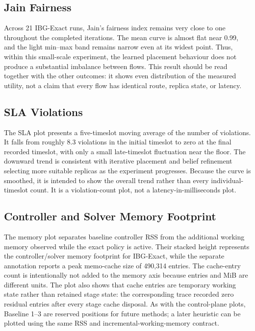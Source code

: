 \documentclass[12pt,a4paper]{article}
\begin{document}
\subsection{Jain Fairness}
Across 21 IBG-Exact runs, Jain's fairness index remains very close to one throughout the completed iterations. The mean curve is almost flat near 0.99, and the light min--max band remains narrow even at its widest point. Thus, within this small-scale experiment, the learned placement behaviour does not produce a substantial imbalance between flows. This result should be read together with the other outcomes: it shows even distribution of the measured utility, not a claim that every flow has identical route, replica state, or latency.

\subsection{SLA Violations}
The SLA plot presents a five-timeslot moving average of the number of violations. It falls from roughly 8.3 violations in the initial timeslot to zero at the final recorded timeslot, with only a small late-timeslot fluctuation near the floor. The downward trend is consistent with iterative placement and belief refinement selecting more suitable replicas as the experiment progresses. Because the curve is smoothed, it is intended to show the overall trend rather than every individual-timeslot count. It is a violation-count plot, not a latency-in-milliseconds plot.

\subsection{Controller and Solver Memory Footprint}
The memory plot separates baseline controller RSS from the additional working memory observed while the exact policy is active. Their stacked height represents the controller/solver memory footprint for IBG-Exact, while the separate annotation reports a peak memo-cache size of 490,314 entries. The cache-entry count is intentionally not added to the memory axis because entries and MiB are different units. The plot also shows that cache entries are temporary working state rather than retained stage state: the corresponding trace recorded zero residual entries after every stage cache disposal. As with the control-plane plots, Baseline 1--3 are reserved positions for future methods; a later heuristic can be plotted using the same RSS and incremental-working-memory contract.
\end{document}
